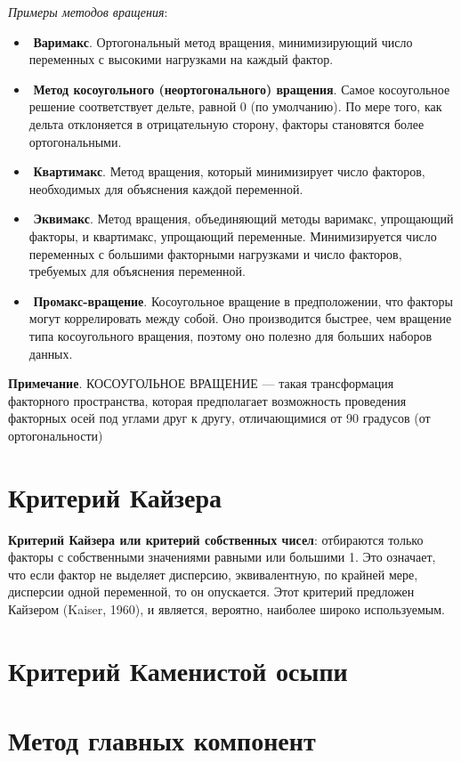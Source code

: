 \documentclass[a4paper, 12pt]{article}
\begin{document}
{\it Примеры методов вращения}:
\begin{itemize}
    \item­	\textbf{Варимакс}. Ортогональный метод вращения, минимизирующий число переменных с высокими нагрузками на каждый фактор. 
    \item ­	\textbf{Метод косоугольного (неортогонального) вращения}. Самое косоугольное решение соответствует дельте, равной 0 (по умолчанию). По мере того, как дельта отклоняется в отрицательную сторону, факторы становятся более ортогональными.
    \item ­	\textbf{Квартимакс}. Метод вращения, который минимизирует число факторов, необходимых для объяснения каждой переменной.
    \item ­	\textbf{Эквимакс}. Метод вращения, объединяющий методы варимакс, упрощающий факторы, и квартимакс, упрощающий переменные. Минимизируется число переменных с большими факторными нагрузками и число факторов, требуемых для объяснения переменной.
    \item ­	\textbf{Промакс-вращение}. Косоугольное вращение в предположении, что факторы могут коррелировать между собой. Оно производится быстрее, чем вращение типа косоугольного вращения, поэтому оно полезно для больших наборов данных.
\end{itemize}

\textbf{Примечание}. КОСОУГОЛЬНОЕ ВРАЩЕНИЕ --- такая трансформация факторного пространства, которая предполагает возможность проведения факторных осей под углами друг к другу, отличающимися от 90 градусов (от ортогональности)

\section{Критерий Кайзера}
\textbf{Критерий Кайзера или критерий собственных чисел}: отбираются только факторы с собственными значениями равными или большими 1. Это означает, что если фактор не выделяет дисперсию, эквивалентную, по крайней мере, дисперсии одной переменной, то он опускается. Этот критерий предложен Кайзером (Kaiser, 1960), и является, вероятно, наиболее широко используемым.
\section{Критерий Каменистой осыпи}
\section{Метод главных компонент}
\end{document}
